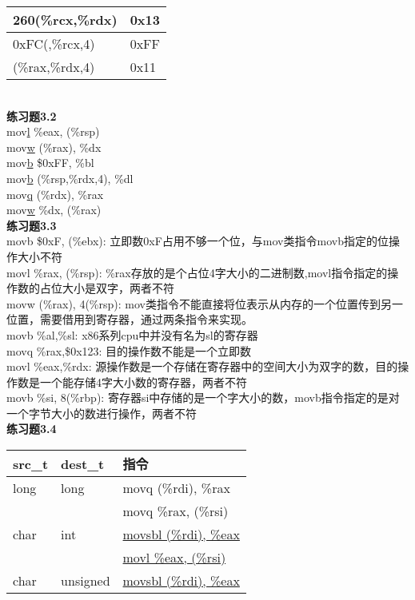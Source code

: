 \documentclass{article}
\begin{document}
\begin{CJK}{UTF8}{uyhei}
\begin{table}[htbp]
\begin{tabular}{|m{15em}<{\centering}|m{8em}<{\centering}|}
	\hline
	260(\%rcx,\%rdx)	&	0x13	\\
	\hline
	0xFC(,\%rcx,4)	&	0xFF	\\
	\hline
	(\%rax,\%rdx,4)	&	0x11	\\
	\hline
\end{tabular}
\end{table}	\\[2ex]
\newpage
\noindent\textbf{练习题3.2}	\\[2ex]
mov\underline{l} \%eax, (\%rsp)	\\
mov\underline{w} (\%rax), \%dx	\\
mov\underline{b} \$0xFF, \%bl	\\
mov\underline{b} (\%rsp,\%rdx,4), \%dl	\\
mov\underline{q} (\%rdx), \%rax	\\
mov\underline{w} \%dx, (\%rax)	\\[3ex]
\textbf{练习题3.3}	\\[2ex]
movb \$0xF, (\%ebx): 立即数0xF占用不够一个位，与mov类指令movb指定的位操作大小不符	\\
movl \%rax, (\%rsp): \%rax存放的是个占位4字大小的二进制数,movl指令指定的操作数的占位大小是双字，两者不符	\\
movw (\%rax), 4(\%rsp): mov类指令不能直接将位表示从内存的一个位置传到另一位置，需要借用到寄存器，通过两条指令来实现。	\\
movb \%al,\%sl: x86系列cpu中并没有名为sl的寄存器	\\
movq \%rax,\$0x123: 目的操作数不能是一个立即数	\\
movl \%eax,\%rdx: 源操作数是一个存储在寄存器中的空间大小为双字的数，目的操作数是一个能存储4字大小数的寄存器，两者不符	\\
movb \%si, 8(\%rbp): 寄存器si中存储的是一个字大小的数，movb指令指定的是对一个字节大小的数进行操作，两者不符	\\[3ex]
\textbf{练习题3.4}	\\[2ex]
\begin{table}[htbp]
\centering
\begin{tabular}{|m{8em}<{\centering}|m{8em}<{\centering}|m{12em}<{\centering}|}
	\hline
	src\_t	&	dest\_t	&	指令	\\
	\hline
	long	&	long	&	movq (\%rdi), \%rax	\\
		&		&	movq \%rax, (\%rsi)	\\
	char	&	int	&	\underline{movsbl (\%rdi), \%eax}	\\
	&	&	\underline{movl \%eax, (\%rsi)}	\\
	char	&	unsigned	&	\underline{movsbl (\%rdi), \%eax}	\\

\end{tabular}
\end{table}
\end{CJK}
\end{document}

